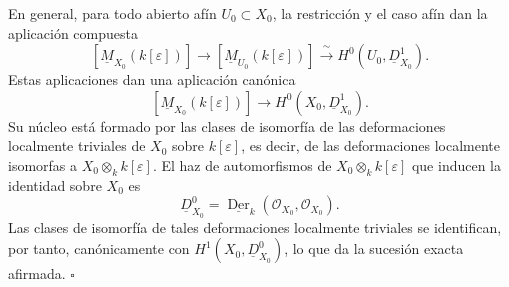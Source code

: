 
En general, para todo abierto afín $U_0\subset X_0$, la restricción y
el caso afín dan la aplicación compuesta
\[
[\underline M_{X_0}(k[\varepsilon])]
\longrightarrow[\underline M_{U_0}(k[\varepsilon])]
\xrightarrow{\ \sim\ }H^0(U_0,\underline D^1_{X_0}).
\]
Estas aplicaciones dan una aplicación canónica
\[
[\underline M_{X_0}(k[\varepsilon])]
\longrightarrow H^0(X_0,\underline D^1_{X_0}).
\]
Su núcleo está formado por las clases de isomorfía de las
deformaciones localmente triviales de $X_0$ sobre
$k[\varepsilon]$, es decir, de las deformaciones localmente isomorfas
a $X_0\otimes_k k[\varepsilon]$. El haz de automorfismos de
$X_0\otimes_k k[\varepsilon]$ que inducen la identidad sobre $X_0$
es
\[
\underline D^0_{X_0}
=\underline{\operatorname{Der}}_k
  (\mathcal O_{X_0},\mathcal O_{X_0}).
\]
Las clases de isomorfía de tales deformaciones localmente triviales
se identifican, por tanto, canónicamente con
$H^1(X_0,\underline D^0_{X_0})$, lo que da la sucesión exacta
afirmada. \hfill$\square$

